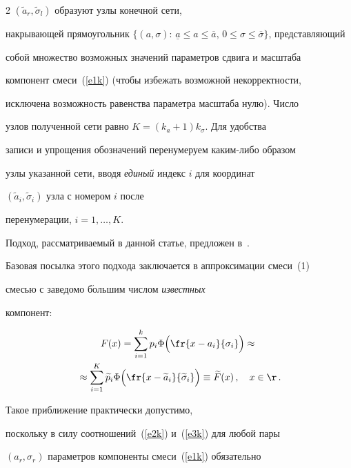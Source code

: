 \begin{multicols}{2}
$(\widetilde a_r,\widetilde\sigma_l)$ образуют узлы конечной сети,


накрывающей прямоугольник $\{(a,\sigma):\,\underline a\le


a\le\overline a,\,0\le\sigma\le\overline\sigma\}$, представляющий


собой множество возможных значений параметров сдвига и масштаба


компонент смеси~(\ref{e1k}) (чтобы избежать возможной некорректности,


исключена возможность равенства параметра масштаба нулю). Число


узлов полученной сети равно $K=(k_{a}+1)k_{\sigma}$. Для удобства


записи и упрощения обозначений перенумеруем каким-либо образом


узлы указанной сети, вводя {\it единый} индекс $i$ для координат


$(\widetilde a_i,\widetilde \sigma_i)$ узла с номером $i$ после


перенумерации, $i=1,\ldots,K$.





Подход, рассматриваемый в данной статье, предложен в~\cite{1k}.


Базовая посылка этого подхода заключается в аппроксимации смеси~(1)


смесью с заведомо б$\acute{\mbox{о}}$льшим числом {\it известных}


компонент:


\begin{multline}


F(x)=\sum_{i=1}^kp_i\Phi\Big(\fr{x-a_i}{\sigma_i}\Big)\approx{}\\


{}\approx


\sum_{i=1}^K\widetilde p_i\Phi\Big(\fr{x-\widetilde


a_i}{\widetilde\sigma_i}\Big)\equiv \widetilde F(x)\,,\quad


x\in\r\,.


\label{e4k}


\end{multline}


Такое приближение практически допустимо,


поскольку в силу соотношений~(\ref{e2k}) и~(\ref{e3k}) для любой пары


$(a_r,\sigma_r)$ параметров компоненты смеси~(\ref{e1k}) обязательно



\end{multicols}
